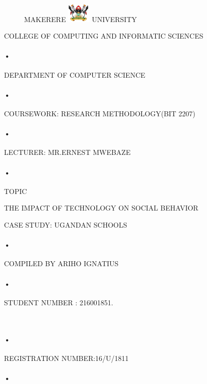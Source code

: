 \documentclass[10pt,]{article}
\begin{document}
\begin{titlepage}
 \begin{figure}[h]
  \centerline{\small MAKERERE 
  \includegraphics[width=0.1\textwidth]{muk_log} UNIVERSITY}
\end{figure}
\centerline{COLLEGE OF COMPUTING AND INFORMATIC SCIENCES}
\paragraph{•}
\centerline{DEPARTMENT OF COMPUTER SCIENCE\\}
\paragraph{•}

\centerline{COURSEWORK: RESEARCH METHODOLOGY(BIT 2207)\\}
\paragraph{•}

\centerline{LECTURER: MR.ERNEST MWEBAZE}
\paragraph{•}

\centerline{TOPIC\\} THE IMPACT OF TECHNOLOGY ON SOCIAL BEHAVIOR\\
 \centerline{CASE STUDY: UGANDAN SCHOOLS\\}
\paragraph{•}

\centerline{COMPILED BY
 ARIHO IGNATIUS}
 \paragraph{•}

\centerline{STUDENT NUMBER : 216001851.}\
\paragraph{•}
\centerline{REGISTRATION NUMBER:16/U/1811}
\paragraph{•}




\end{titlepage}
\tableofcontents
\newpage
\end{document}
